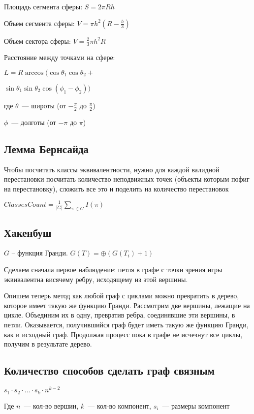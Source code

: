 \documentclass[14pt,a4paper,oneside]{article}
\begin{document}
\hspace*{1.3em}Площадь сегмента сферы: $S=2\pi R h$

Объем сегмента сферы: $V=\pi h^2 \left(R - \frac h 3\right)$

Объем сектора сферы: $V=\frac 2 3 \pi h^2 R$

Расстояние между точками на сфере:

$L = R \arccos(\cos{\theta_1} \cos{\theta_2} + $

$\sin{\theta_1} \sin{\theta_2} \cos(\phi_1 - \phi_2))$

где $\theta$~--- широты (от $-{\frac \pi 2}$ до ${\frac \pi 2}$)

$\phi$~--- долготы (от $-\pi$ до $\pi$)

\subsection{Лемма Бернсайда}
Чтобы посчитать классы эквивалентности, нужно для каждой валидной перестановки посчитать количество неподвижных 
точек (объекты которым пофиг на перестановку), сложить все это и поделить на количество перестановок

$ClassesCount = {\frac 1 {|G|}} \sum_{\pi \in G} I(\pi)$

\subsection{Хакенбуш}
$G$ -- функция Гранди.
$G(T) = \oplus (G(T_i) + 1)$

Сделаем
сначала первое наблюдение: петля в графе с точки зрения игры эквивалентна
висячему ребру, исходящему из этой вершины.

Опишем теперь метод как любой граф с циклами можно превратить в
дерево, которое имеет такую же функцию Гранди. Рассмотрим две вершины,
лежащие на цикле. Объединим их в одну, превратив ребра, соединявшие эти
вершины, в петли. Оказывается, получившийся граф будет иметь такую же
функцию Гранди, как и исходный граф. Продолжая процесс пока в графе не
исчезнут все циклы, получим в результате дерево.

\subsection{Количество способов сделать граф связным}

$s_1 \cdot s_2 \cdot \ldots \cdot s_k \cdot n^{k-2}$

Где $n$~--- кол-во вершин, $k$~--- кол-во компонент,
$s_i$~--- размеры компонент
\end{document}
